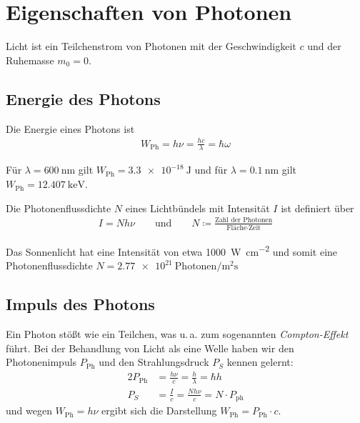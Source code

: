 
\section{Eigenschaften von Photonen}
Licht ist ein Teilchenstrom von Photonen mit der Geschwindigkeit $c$
und der Ruhemasse $m_0=0$.


\subsection{Energie des Photons}
Die Energie eines Photons ist
\begin{gather*}
  W_\text{Ph} = h\nu = \frac{hc}{\lambda} = \hbar\omega
\end{gather*}%
%

\Beispiel{}
Für $\lambda=\SI{600}{\nano\meter}$ gilt
$W_\text{Ph}=\SI{3.3e-18}{\joule}$
und für $\lambda=\SI{0.1}{\nano\meter}$ gilt
$W_\text{Ph}=\SI{12.407}{\kilo\electronvolt}$.

Die Photonenflussdichte $N$
eines Lichtbündels mit Intensität $I$ ist definiert über
\begin{gather*}
  I = Nh\nu
  \qquad\text{und}\qquad
  N \coloneqq 
  \frac{\text{Zahl der Photonen}}{\text{Fläche}\cdot\text{Zeit}}
\end{gather*}

\Beispiel{}
Das Sonnenlicht hat eine Intensität von etwa
\SI{1000}{\watt\per\centi\meter\squared} und somit eine
Photonenflussdichte
$N=\SI{2.77e21}{{\text{Photonen}}\per\square\meter\second}$


\subsection{Impuls des Photons}
Ein Photon stößt wie ein Teilchen, was u.\,a. zum sogenannten
\emph{Compton-Effekt} führt.
Bei der Behandlung von Licht als eine Welle haben wir den
Photonenimpuls $P_\text{Ph}$ und den Strahlungsdruck $P_S$ kennen
gelernt:
\begin{alignat*}{2}
  P_\text{Ph} &= \frac{h\nu}{c} = \frac{h}{\lambda} = \hbar h\\
  P_S &= \frac{I}{c} = \frac{Nh\nu}{c} = N\cdot P_\text{ph}
\end{alignat*}
und wegen $W_\text{Ph}=h\nu$ ergibt sich die Darstellung
$W_\text{Ph} = P_\text{Ph}\cdot c$.



